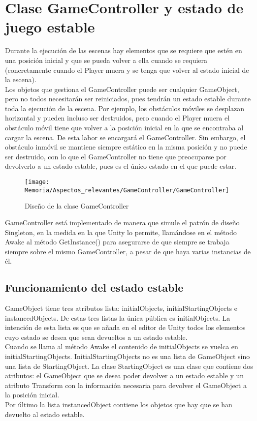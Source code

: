 \section{Clase GameController y estado de juego estable}
Durante la ejecución de las escenas hay elementos que se requiere que estén en una posición inicial y que se pueda volver a ella cuando se requiera (concretamente cuando el Player muera y se tenga que volver al estado inicial de la escena).\\
Los objetos que gestiona el GameController puede ser cualquier GameObject, pero no todos necesitarán ser reiniciados, pues tendrán un estado estable durante toda la ejecución de la escena. Por ejemplo, los obstáculos móviles se desplazan horizontal y pueden incluso ser destruidos, pero cuando el Player muera el obstáculo móvil tiene que volver a la posición inicial en la que se encontraba al cargar la escena. De esta labor se encargará el GameController. Sin embargo, el obstáculo inmóvil se mantiene siempre estático en la misma posición y no puede ser destruido, con lo que el GameController no tiene que preocuparse por devolverlo a un estado estable, pues es el único estado en el que puede estar.

\begin{figure}[h]
\texttt{[image: Memoria/Aspectos\_relevantes/GameController/GameController]}
\caption{Diseño de la clase GameController}
\end{figure}

GameController está implementado de manera que simule el patrón de diseño Singleton, en la medida en la que Unity lo permite, llamándose en el método Awake al método GetInstance() para asegurarse de que siempre se trabaja siempre sobre el mismo GameController, a pesar de que haya varias instancias de él.

\subsection{Funcionamiento del estado estable}
GameObject tiene tres atributos lista: initialObjects, initialStartingObjects e instancedObjects. De estas tres listas la única pública es initialObjects. La intención de esta lista es que se añada en el editor de Unity todos los elementos cuyo estado se desea que sean devueltos a un estado estable.\\
Cuando se llama al método Awake el contenido de initialObjects se vuelca en initialStartingObjects. InitialStartingObjects no es una lista de GameObject sino una lista de StartingObject. La clase StartingObject es una clase que contiene dos atributos: el GameObject que se desea poder devolver a un estado estable y un atributo Transform con la información necesaria para devolver el GameObject a la posición inicial.\\
Por último la lista instancedObject contiene los objetos que hay que se han devuelto al estado estable.

